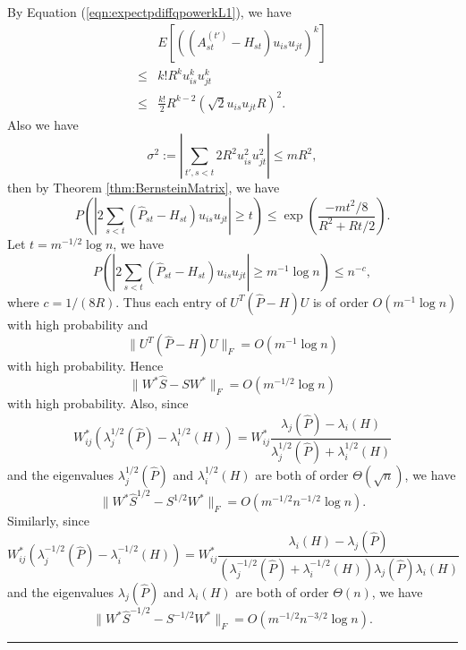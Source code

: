 \documentclass[a4paper]{article}
\newenvironment{proof}{{\bf Proof:  }}{\hfill\rule{2mm}{2mm}}
\begin{document}
\begin{proof}
By Equation (\ref{eqn:expectpdiffqpowerkL1}), we have
\begin{align*}
	& E\left[\left((A^{(t')}_{st} - H_{st}) u_{is} u_{jt}\right)^k\right] \\
    \le & k! R^k u_{is}^k u_{jt}^k \\
    \le & \frac{k!}{2} R^{k-2} (\sqrt{2} u_{is} u_{jt} R)^2.
\end{align*}
Also we have
\[
	\sigma^2 := |\sum_{t', s<t} 2 R^2 u_{is}^2 u_{jt}^2| \le m R^2,
\]
then by Theorem \ref{thm:BernsteinMatrix}, we have
\[
	P \left( \left| 2 \sum_{s<t} (\hat{P}_{st} - H_{st}) u_{is} u_{jt} \right| \ge t \right)
    \le \exp \left( \frac{-m t^2/8}{R^2 + R t /2} \right).
\]
Let $t = m^{-1/2} \log n$, we have
\[
P \left( \left| 2 \sum_{s<t} (\hat{P}_{st} - H_{st}) u_{is} u_{jt} \right| \ge m^{-1} \log n \right)
    \le n^{-c},
\]
where $c = 1/(8R)$.
Thus each entry of $U^T(\hat{P} - H)U$ is of order $O(m^{-1} \log n)$ with high probability and
\begin{equation}
\label{eqn:uPhatdiffHuL1}
	\|U^T(\hat{P} - H)U\|_F = O(m^{-1} \log n)
\end{equation}
with high probability.
Hence
\[
	\| W^* \hat{S} - S W^* \|_F = O(m^{-1/2} \log n)
\]
with high probability.
Also, since
\[
	W_{ij}^* (\lambda_j^{1/2}(\hat{P}) - \lambda_i^{1/2}(H)) = W_{ij}^* \frac{\lambda_j(\hat{P}) - \lambda_i(H)}{\lambda_j^{1/2}(\hat{P}) + \lambda_i^{1/2}(H)}
\]
and the eigenvalues $\lambda_j^{1/2}(\hat{P})$ and $\lambda_i^{1/2}(H)$ are both of order $\Theta(\sqrt{n})$, we have
\[
	\| W^* \hat{S}^{1/2} - S^{1/2} W^* \|_F = O(m^{-1/2} n^{-1/2} \log n).
\]
Similarly, since
\[
	W_{ij}^* (\lambda_j^{-1/2}(\hat{P}) - \lambda_i^{-1/2}(H)) = W_{ij}^* \frac{\lambda_i(H) - \lambda_j(\hat{P})}{(\lambda_j^{-1/2}(\hat{P}) + \lambda_i^{-1/2}(H))\lambda_j(\hat{P}) \lambda_i(H)}
\]
and the eigenvalues $\lambda_j(\hat{P})$ and $\lambda_i(H)$ are both of order $\Theta(n)$, we have
\[
	\| W^* \hat{S}^{-1/2} - S^{-1/2} W^* \|_F = O(m^{-1/2} n^{-3/2} \log n).
\]
\end{proof}
\end{document}

